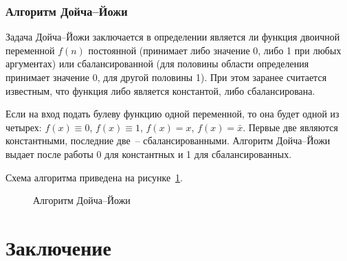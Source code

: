 \documentclass[pscyr,notitlepage]{hedwork}
\newcommand{\pic}[1]{\ref{pic:#1}}
\renewcommand{\~}[1]{\widetilde{#1}}
\begin{document}
  \subsubsection{Алгоритм Дойча--Йожи}
  
  Задача Дойча--Йожи заключается в определении является ли функция двоичной
  переменной \( f(n) \) постоянной (принимает либо значение 0, либо 1 при
  любых аргументах) или сбалансированной (для половины области определения
  принимает значение 0, для другой половины 1). При этом заранее считается
  известным, что функция либо является константой, либо сбалансирована.
  
  Если на вход подать булеву функцию одной переменной, то она будет одной из
  четырех: \( f(x) \equiv 0 \), \( f(x) \equiv 1 \), \( f(x) = x \),
  \( f(x) = \bar{x} \). Первые две являются константными, последние две~-- 
  сбалансированными. Алгоритм Дойча--Йожи выдает после работы 0 для константных
  и 1 для сбалансированных.
  
  Схема алгоритма приведена на рисунке~\pic{Deutsch}.~\cite{brbr,deutcsh}
  \begin{figure}[h!]
    \center
    \caption{Алгоритм Дойча--Йожи}
    \label{pic:Deutsch}
  \end{figure}
  
  \section*{Заключение}
  
\end{document}
